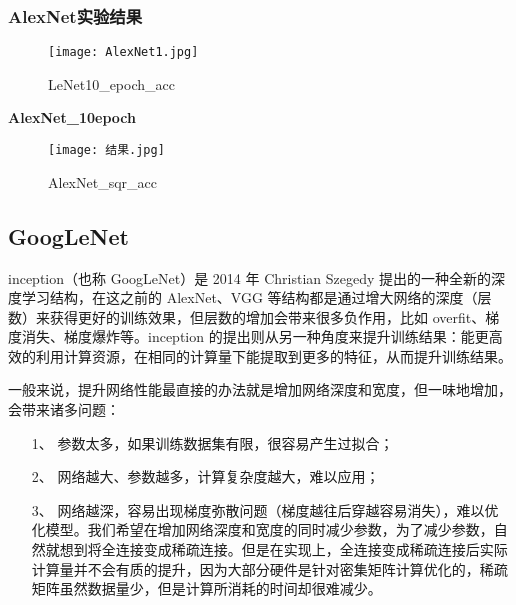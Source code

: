\subsubsection{AlexNet实验结果}
\begin{figure}[!h]
	\centering
	\texttt{[image: AlexNet1.jpg]}
	\caption{LeNet10\_epoch\_acc}
	\label{fig:circuitm1}
\end{figure} \par
\noindent \textbf{AlexNet\_10epoch}\par
\begin{figure}[!h]
	\centering
	\texttt{[image: 结果.jpg]}
	\caption{AlexNet\_sqr\_acc}
	\label{fig:circuitm1}
\end{figure} \par
\subsection{GoogLeNet}
inception（也称 GoogLeNet）是 2014 年 Christian Szegedy 提出的一种全新的深度学习结构，在这之前的 AlexNet、VGG 等结构都是通过增大网络的深度（层数）来获得更好的训练效果，但层数的增加会带来很多负作用，比如 overfit、梯度消失、梯度爆炸等。inception 的提出则从另一种角度来提升训练结果：能更高效的利用计算资源，在相同的计算量下能提取到更多的特征，从而提升训练结果。

一般来说，提升网络性能最直接的办法就是增加网络深度和宽度，但一味地增加，会带来诸多问题：
	\begin{enumerate}
	\item [1、] 参数太多，如果训练数据集有限，很容易产生过拟合；
	\item [2、]  网络越大、参数越多，计算复杂度越大，难以应用；
	\item[3、]网络越深，容易出现梯度弥散问题（梯度越往后穿越容易消失），难以优化模型。我们希望在增加网络深度和宽度的同时减少参数，为了减少参数，自然就想到将全连接变成稀疏连接。但是在实现上，全连接变成稀疏连接后实际计算量并不会有质的提升，因为大部分硬件是针对密集矩阵计算优化的，稀疏矩阵虽然数据量少，但是计算所消耗的时间却很难减少。
\end{enumerate}
